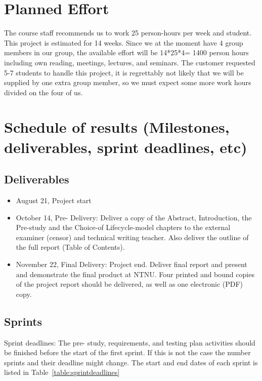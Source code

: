 \section{Planned Effort}
The course staff recommends us to work 25 person-hours per week and student. This project is estimated for 14 weeks. Since we at the moment have 4 group members in our group, the available effort will be 14*25*4= 1400 person hours including own reading, meetings, lectures, and seminars. The customer requested 5-7 students to handle this project, it is regrettably not likely that we will be supplied by one extra group member, so we must expect some more work hours divided on the four of us.

\section{Schedule of results (Milestones, deliverables, sprint deadlines, etc)}
\subsection {Deliverables}

\begin {itemize}

\item August 21, Project start

\item October 14, Pre- Delivery: Deliver a copy of the Abstract, Introduction, the Pre-study and the Choice-of Lifecycle-model chapters to the external examiner (censor) and technical writing teacher. Also deliver the outline of the full report (Table of  Contents).

\item November 22, Final Delivery: Project end. Deliver final report and present and demonstrate the final product at NTNU. Four printed and bound copies of  the project report should be delivered, as well as one electronic (PDF) copy.

\end {itemize}

\subsection {Sprints}

Sprint deadlines:
The pre- study, requirements, and testing plan activities should be finished before the start of the first sprint. If this is not the case the number sprints and their deadline might change. The start and end dates of each sprint is listed in Table~\ref{table:sprintdeadlines}

